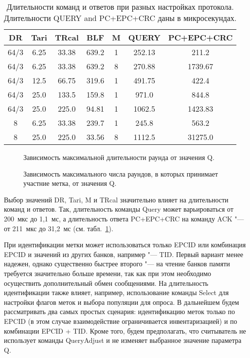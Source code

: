 \begin{table}[!t]
	\renewcommand{\arraystretch}{1.3}
	\caption{Длительности команд и ответов при разных настройках протокола.
	Длительности QUERY and PC+EPC+CRC даны в микросекундах.}
	\label{table:ch2_commands_and_replies_durations}
	\centering
	\begin{tabular}{|c|c|c|c|c|c|c|}
		\hline
		DR   & Tari & TRcal & BLF   & M & QUERY & PC+EPC+CRC  \\\hline
		64/3 & 6.25 & 33.38 & 639.2 & 1 & 252.13 & 211.2      \\\hline
		64/3 & 6.25 & 33.38 & 639.2 & 8 & 270.88 & 1739.67    \\\hline
		64/3 & 12.5 & 66.75 & 319.6 & 1 & 491.75 & 422.4      \\\hline
		64/3 & 25.0 & 133.5 & 159.8 & 1 & 971.0  & 844.8      \\\hline
		64/3 & 25.0 & 225.0 & 94.81 & 1 & 1062.5 & 1423.83    \\\hline
		8    & 6.25 & 33.38 & 239.7 & 1 & 245.8  & 563.2      \\\hline
		8    & 25.0 & 225.0 & 33.56 & 8 & 1112.5 & 31275.0    \\\hline
	\end{tabular}
\end{table}

\begin{figure}[!t]
	\caption{Зависимость максимальной длительности раунда от значения Q.}
	\label{fig:ch2_round_durations}
\end{figure}

\begin{figure}[!t]
	\caption{Зависимость максимального числа раундов, в которых принимает участние метка, от значения Q.}
	\label{fig:ch2_round_numbers}
\end{figure}


Выбор значений DR, Tari, M и TRcal значительно влияет на длительности команд и ответов. Так, длительность команды Query может варьироваться от 200~мкс до 1,1~мс, а длительность ответа PC+EPC+CRC на команду ACK "--- от 211~мкс до 31,2~мс (см. табл.~\ref{table:ch2_commands_and_replies_durations}).

При идентификации метки может использоваться только EPCID или комбинация EPCID и значений из других банков, например "--- TID. Первый вариант менее надежен, однако существенно быстрее второго "--- на чтение банков памяти требуется значительно больше времени, так как при этом необходимо осуществить дополнительный обмен сообщениями. На длительность идентификации также влияет, например, использование команды Select для настройки флагов меток и выбора популяции для опроса. В дальнейшем будем рассматривать два самых простых сценария: идентификацию меток только по EPCID (в этом случае взаимодействие ограничивается инвентаризацией) и по комбинации EPCID + TID. Кроме того, будем предполагать, что считыватель не использует команды QueryAdjust и не изменяет выбранное значение параметра Q.

